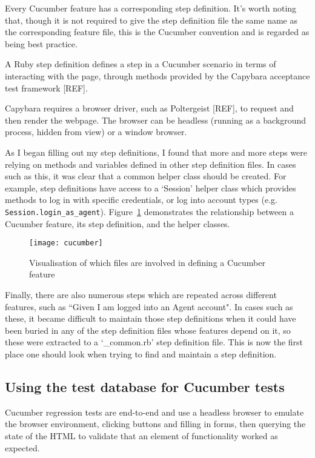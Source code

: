 Every Cucumber feature has a corresponding step definition. It's worth noting that, though it is not required to give the step definition file the same name as the corresponding feature file, this is the Cucumber convention and is regarded as being best practice.

A Ruby step definition defines a step in a Cucumber scenario in terms of interacting with the page, through methods provided by the Capybara acceptance test framework [REF]. %

Capybara requires a browser driver, such as Poltergeist [REF], to request and then render the webpage. The browser can be headless (running as a background process, hidden from view) or a window browser. %

As I began filling out my step definitions, I found that more and more steps were relying on methods and variables defined in other step definition files. In cases such as this, it was clear that a common helper class should be created. For example, step definitions have access to a `Session' helper class which provides methods to log in with specific credentials, or log into account types (e.g. \lstinline{Session.login_as_agent}). Figure~\ref{uml:cucumber} demonstrates the relationship between a Cucumber feature, its step definition, and the helper classes.

\begin{figure}[h!]
  \centering
    \ifimages
    \texttt{[image: cucumber]}
    \fi
  \caption{Visualisation of which files are involved in defining a Cucumber feature}
  \label{uml:cucumber}
\end{figure}

Finally, there are also numerous steps which are repeated across different features, such as ``Given I am logged into an Agent account". In cases such as these, it became difficult to maintain those step definitions when it could have been buried in any of the step definition files whose features depend on it, so these were extracted to a `\_common.rb' step definition file. This is now the first place one should look when trying to find and maintain a step definition.

\subsection{Using the test database for Cucumber tests}

Cucumber regression tests are end-to-end and use a headless browser to emulate the browser environment, clicking buttons and filling in forms, then querying the state of the HTML to validate that an element of functionality worked as expected.

